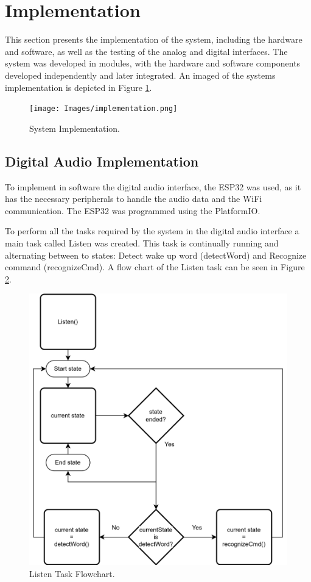 \section{Implementation}

This section presents the implementation of the system, including the hardware and software, as well as the testing of the analog and digital interfaces. The system was developed in modules, with the hardware and software components developed independently and later integrated. An imaged of the systems implementation is depicted in Figure \ref{fig:systemImplementation}.

\begin{figure}[H]
    \centering
    \texttt{[image: Images/implementation.png]}
    \caption{System Implementation.}
    \label{fig:systemImplementation}
\end{figure}

\subsection{Digital Audio Implementation}

To implement in software the digital audio interface, the ESP32 was used, as it has the necessary peripherals to handle the audio data and the WiFi communication. The ESP32 was programmed using the PlatformIO.

To perform all the tasks required by the system in the digital audio interface a main task called Listen was created. This task is continually running and alternating between to states: Detect wake up word (detectWord) and Recognize command (recognizeCmd). A flow chart of the Listen task can be seen in Figure \ref{fig:ListenTaskFlowchart}.
\begin{figure}[H]
    \centering
    \includegraphics*[scale = 0.15]{Images/listen.png}
    \caption{Listen Task Flowchart.}
    \label{fig:ListenTaskFlowchart}
\end{figure}

